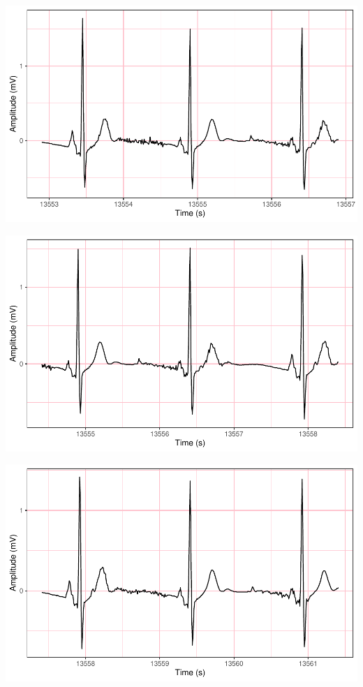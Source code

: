 \documentclass[
]{article}
\begin{document}
\begin{center}\includegraphics{report_files/figure-latex/abnormal-interval-21} \end{center}

\begin{center}\includegraphics{report_files/figure-latex/abnormal-interval-22} \end{center}

\begin{center}\includegraphics{report_files/figure-latex/abnormal-interval-23} \end{center}
\end{document}
